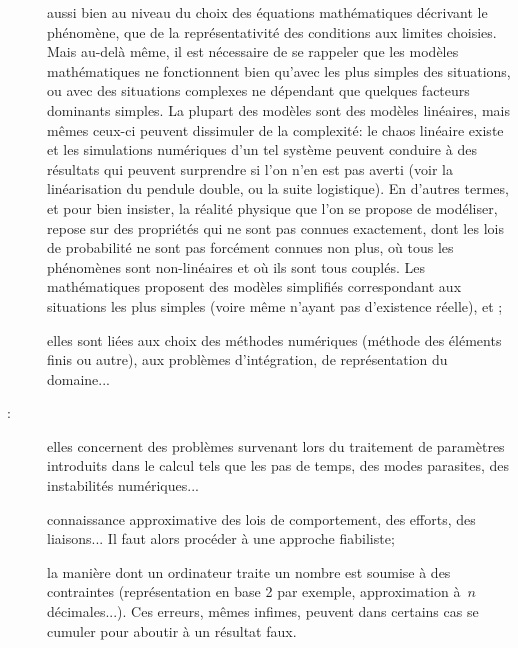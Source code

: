 \begin{description}
  \item[] aussi bien au niveau du choix des équations mathématiques décrivant le phénomène, que de la représentativité des conditions aux limites choisies. Mais au-delà même, il est nécessaire de se rappeler que les modèles mathématiques ne fonctionnent bien qu'avec les plus simples des situations, ou avec des situations complexes ne dépendant que quelques facteurs dominants simples. La plupart des modèles sont des modèles linéaires, mais mêmes ceux-ci peuvent dissimuler de la complexité: le chaos linéaire existe et les simulations numériques d'un tel système peuvent conduire à des résultats qui peuvent surprendre si l'on n'en est pas averti (voir la linéarisation du pendule double, ou la suite logistique).
  En d'autres termes, et pour bien insister, la réalité physique que l'on se propose de modéliser, repose sur des propriétés qui ne sont pas connues exactement, dont les lois de probabilité ne sont pas forcément connues non plus, où tous les phénomènes sont non-linéaires et où ils sont tous couplés. Les mathématiques proposent des modèles simplifiés correspondant aux situations les plus simples (voire même n'ayant pas d'existence réelle), et ;
  \item[] elles sont liées aux choix des méthodes numériques (méthode des éléments finis ou autre), aux problèmes d'intégration, de représentation du domaine...
  \item[:] elles concernent des problèmes survenant lors du traitement de paramètres introduits dans le calcul tels que les pas de temps, des modes parasites, des instabilités numériques...
  \item[] connaissance approximative des lois de comportement, des efforts, des liaisons... Il faut alors procéder à une approche fiabiliste;
  \item[] la manière dont un ordinateur traite un nombre est soumise à des contraintes (représentation en base 2 par exemple, approximation à~$n$ décimales...). Ces erreurs, mêmes infimes, peuvent dans certains cas se cumuler pour aboutir à un résultat faux.
\end{description}

